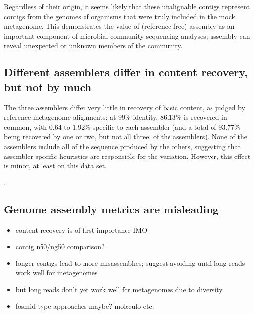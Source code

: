 \documentclass[10pt,a4paper,twocolumn]{article}
\begin{document}
Regardless of their origin, it seems likely that these unalignable
contigs represent contigs from the genomes of organisms that were
truly included in the mock metagenome.  This demonstrates the value of
(reference-free) assembly as an important component of microbial
community sequencing analyses; assembly can reveal unexpected or
unknown members of the community.

\subsection*{Different assemblers differ in content recovery, but not by much}

The three assemblers differ very little in recovery of basic content,
as judged by reference metagenome alignments: at 99\% identity, 86.13\%
is recovered in common, with 0.64 to 1.92\% specific to each assembler
(and a total of 93.77\% being recovered by one or two, but not all three,
of the assemblers). None of the assemblers include all of the sequence
produced by the others, suggesting that assembler-specific heuristics
are responsible for the variation. However, this effect is minor, at least
on this data set.


. %

\subsection*{Genome assembly metrics are misleading}

\begin{itemize}
\item content recovery is of first importance IMO
\item contig n50/ng50 comparison?
\item longer contigs lead to more misassemblies; suggest avoiding until long reads work well for metagenomes
\item but long reads don't yet work well for metagenomes due to diversity
\item fosmid type approaches maybe? moleculo etc.
\end{itemize}
\end{document}
